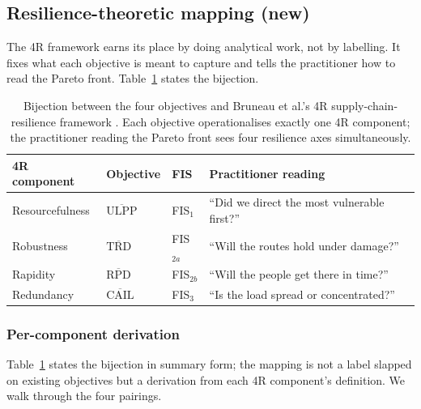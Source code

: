 \documentclass[applsci,article,submit,moreauthors,pdftex]{Definitions/mdpi}
\begin{document}
\subsection{Resilience-theoretic mapping (new)}\label{sec:resilience-mapping}

The 4R framework earns its place by doing analytical work, not by labelling.
It fixes what each objective is meant to capture and tells the practitioner how
to read the Pareto front. Table~\ref{tab:4r-mapping} states the bijection.

\begin{table}[!t]
\centering
\caption{Bijection between the four objectives and Bruneau et al.'s 4R
supply-chain-resilience framework \cite{bruneau2003}. Each objective
operationalises exactly one 4R component; the practitioner reading the
Pareto front sees four resilience axes simultaneously.}
\label{tab:4r-mapping}
\small
\begin{tabular}{l l l l}
\toprule
\textbf{4R component} & \textbf{Objective} & \textbf{FIS} & \textbf{Practitioner reading} \\
\midrule
Resourcefulness  & $\overline{\mathrm{ULPP}}$ & FIS$_1$        & ``Did we direct the most vulnerable first?'' \\
Robustness       & $\overline{\mathrm{TRD}}$  & FIS$_{2a}$     & ``Will the routes hold under damage?'' \\
Rapidity         & $\overline{\mathrm{RPD}}$  & FIS$_{2b}$     & ``Will the people get there in time?'' \\
Redundancy       & $\overline{\mathrm{CAIL}}$ & FIS$_3$        & ``Is the load spread or concentrated?'' \\
\bottomrule
\end{tabular}
\end{table}

\subsubsection*{Per-component derivation}

Table~\ref{tab:4r-mapping} states the bijection in summary form; the
mapping is not a label slapped on existing objectives but a derivation
from each 4R component's definition. We walk through the four pairings.
\end{document}
